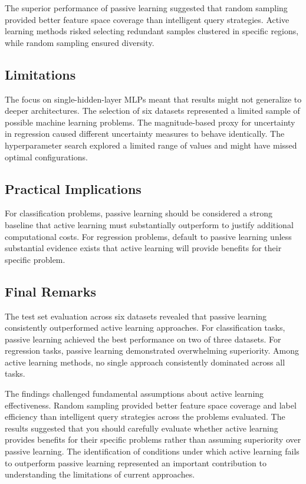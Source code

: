 \documentclass[conference]{IEEEtran}
\begin{document}
The superior performance of passive learning suggested that random sampling provided better feature space coverage than intelligent query strategies. Active learning methods risked selecting redundant samples clustered in specific regions, while random sampling ensured diversity.

\subsection{Limitations}

The focus on single-hidden-layer MLPs meant that results might not generalize to deeper architectures. The selection of six datasets represented a limited sample of possible machine learning problems. The magnitude-based proxy for uncertainty in regression caused different uncertainty measures to behave identically. The hyperparameter search explored a limited range of values and might have missed optimal configurations.

\subsection{Practical Implications}

For classification problems, passive learning should be considered a strong baseline that active learning must substantially outperform to justify additional computational costs. For regression problems, default to passive learning unless substantial evidence exists that active learning will provide benefits for their specific problem.

\subsection{Final Remarks}

The test set evaluation across six datasets revealed that passive learning consistently outperformed active learning approaches. For classification tasks, passive learning achieved the best performance on two of three datasets. For regression tasks, passive learning demonstrated overwhelming superiority. Among active learning methods, no single approach consistently dominated across all tasks.

The findings challenged fundamental assumptions about active learning effectiveness. Random sampling provided better feature space coverage and label efficiency than intelligent query strategies across the problems evaluated. The results suggested that you should carefully evaluate whether active learning provides benefits for their specific problems rather than assuming superiority over passive learning. The identification of conditions under which active learning fails to outperform passive learning represented an important contribution to understanding the limitations of current approaches.
\end{document}
